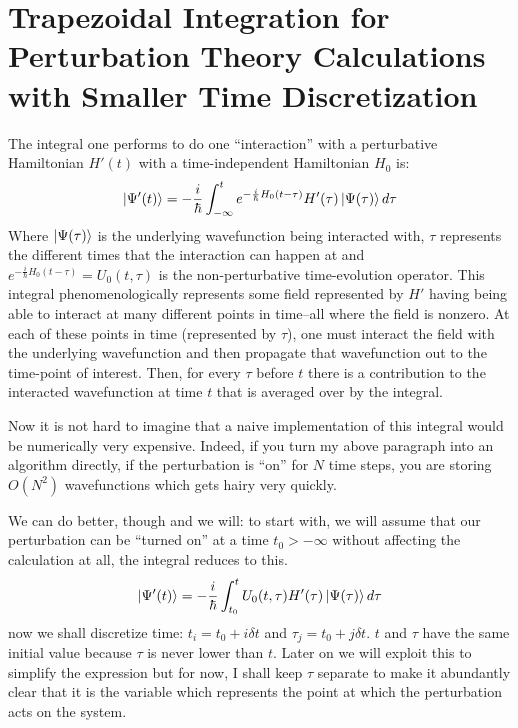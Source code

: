 \section{Trapezoidal Integration for Perturbation Theory Calculations with Smaller Time Discretization}

The integral one performs to do one ``interaction'' with a perturbative Hamiltonian $H'(t)$ with a time-independent Hamiltonian $H_0$ is:
\begin{align*}
	\ket{\Psi'(t)} = -\frac{i}{\hbar} \int_{-\infty}^{t} e^{-\frac{i}{\hbar} H_0 (t - \tau)} H'(\tau) \ket{\Psi (\tau)} d\tau
\end{align*}
Where $\ket{\Psi (\tau)} $ is the underlying wavefunction being interacted with, $\tau$ represents the different times that the interaction can happen at and $e^{-\frac{i}{\hbar} H_0 (t - \tau)} = U_0 (t, \tau)$ is the non-perturbative time-evolution operator.  This integral  phenomenologically represents some field represented by $H'$ having being able to interact at many different points in time--all where the field is nonzero.  At each of these points in time (represented by $\tau$), one must interact the field with the underlying wavefunction and then propagate that wavefunction out to the time-point of interest.  Then, for every $\tau$ before $t$ there is a contribution to the interacted wavefunction at time $t$ that is averaged over by the integral.

Now it is not hard to imagine that a naive implementation of this integral would be numerically very expensive.  Indeed, if you turn my above paragraph into an algorithm directly, if the perturbation is ``on'' for $N$ time steps, you are storing $O(N^2)$ wavefunctions which gets hairy very quickly.

We can do better, though and we will: to start with, we will assume that our perturbation can be ``turned on'' at a time $t_0 > -\infty$ without affecting the calculation at all, the integral reduces to this.
\begin{align*}
	\ket{\Psi'(t)} = -\frac{i}{\hbar} \int_{t_0}^{t} U_0 (t, \tau) H'(\tau) \ket{\Psi (\tau)} d\tau
\end{align*}
now we shall discretize time: $t_i = t_0 + i \delta t$ and $\tau_j = t_0 + j \delta t$.  $t$ and $\tau$ have the same initial value because $\tau$ is never lower than $t$.  Later on we will exploit this to simplify the expression but for now, I shall keep $\tau$ separate to make it abundantly clear that it is the variable which represents the point at which the perturbation acts on the system.


